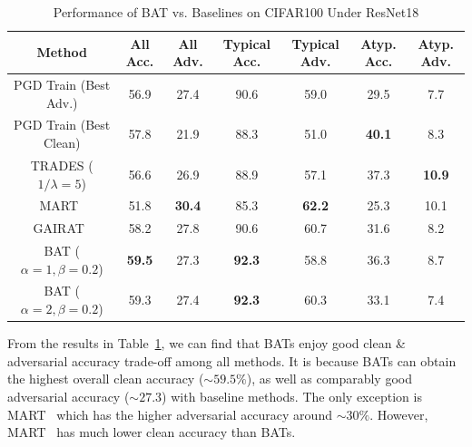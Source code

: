
\vspace{-0.3cm}
\begin{table}[h]
\small
\centering
\caption{Performance of BAT vs. Baselines on CIFAR100 Under ResNet18}
\begin{tabular}{c|cc|cc|cc}
\hline
Method & All Acc. & All Adv. & Typical Acc. & Typical Adv. & Atyp. Acc. & Atyp. Adv. \\
\hline
\hline
PGD Train (Best Adv.) & 56.9 & 27.4 & 90.6 & 59.0 &29.5 & 7.7\\
PGD Train (Best Clean) & 57.8 & 21.9 & 88.3 & 51.0 & \textbf{40.1} & 8.3 \\
TRADES ($1/\lambda = 5$) & 56.6 & 26.9 & 88.9 & 57.1 & 37.3 & \textbf{10.9} \\
MART~\cite{wang2019improving} & 51.8 & \textbf{30.4} & 85.3 & \textbf{62.2} & 25.3 & 10.1\\
GAIRAT~\cite{zhang2020geometry} & 58.2 & 27.8 & 90.6 & 60.7 & 31.6 & 8.2\\
\hline
BAT ($\alpha = 1, \beta = 0.2$) & \textbf{59.5} &27.3 & \textbf{92.3} & 58.8 & 36.3 & 8.7 \\
BAT ($\alpha = 2, \beta = 0.2$) &59.3 & 27.4 & \textbf{92.3} & 60.3 & 33.1 & 7.4 \\
\hline
\hline
\end{tabular}
\label{Tab:results_cifar100}
\end{table}
\vspace{-0.2cm}
From the results in Table~\ref{Tab:results_cifar100}, we can find that BATs enjoy good clean \& adversarial accuracy trade-off among all methods. It is because BATs can obtain the highest overall clean accuracy ($\sim59.5\%$), as well as comparably good adversarial accuracy ($\sim27.3$) with baseline methods. The only exception is MART~\cite{wang2019improving} which has the higher adversarial accuracy around $\sim 30\%$. However, MART~\cite{wang2019improving} has much lower clean accuracy than BATs. 

